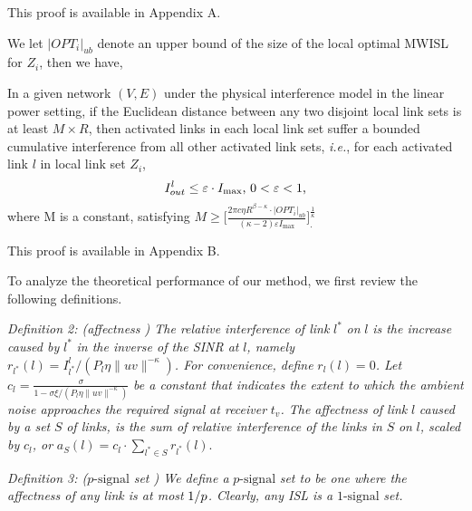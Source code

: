 \documentclass[journal]{IEEEtran}
\begin{document}
\begin{IEEEproof}
This proof is available in Appendix A.
\end{IEEEproof}
We let $|OPT_{i}|_{ub}$ denote an upper bound of the size of the local optimal MWISL for $Z_i$, then we have,

\begin{lemma}
In a given network $(V,E)$ under the physical interference model in the linear power setting, if the Euclidean distance between any two disjoint local link sets is at least $M\times R $, then activated links in each local link set suffer a bounded cumulative interference from all other activated link sets, \emph{i.e.}, for each activated link $l$ in local link set $Z_i $,
{\small{\[
I_{out}^l \le \varepsilon \cdot I_{\max } \mbox{, } 0<\varepsilon<1  \mbox{,}
\vspace*{-0.2\baselineskip}
\]}}
where M is a constant, satisfying
{\small{$ M \ge \biggl[ \frac{2 \pi c \eta R^{\beta-\kappa} \cdot |OPT_{i}|_{ub}}{(\kappa-2) \varepsilon I_{\max}} \biggr]^{\frac{1}{\kappa}}_{\mbox{.}}$}}
\vspace*{-0.5\baselineskip}
\label{lemma1}
\end{lemma}
\begin{IEEEproof}
This proof is available in Appendix B.
\end{IEEEproof}

To analyze the theoretical performance of our method, we first review the following definitions.

\textit{Definition 2: (affectness \cite{S:phy8}) The relative interference of link }$l^* $\textit{ on }$l $\textit{ is the increase caused by }$l^* $\textit{ in the inverse of the SINR at }$l $\textit{, namely }$r_{l^* } (l )=I_{l^* }^{l } /(P_{l } \eta \|uv\|^{-\kappa})$\textit{. For convenience, define }$r_{l} (l )=0$\textit{. Let }$c_l =\frac{\sigma }{1-\sigma \xi /(P_{l } \eta \|uv\|^{-\kappa}) }$\textit{ be a constant that indicates the extent to which the ambient noise approaches the required signal at receiver }$t_v $\textit{. The affectness of link }$l $\textit{ caused by a set }$S$\textit{ of links, is the sum of relative interference of the links in }$S$\textit{ on }$l
$\textit{, scaled by }$c_l $\textit{, or}
{\small{$a_S (l )=c_l \cdot \sum\limits_{l^* \in S} {r_{l^* } (l )}.$}}

\textit{Definition 3: (}$p\mbox{-signal}$\textit{ set \cite{S:phy8}) We define a }$p\mbox{-signal}$\textit{ set to be one where the affectness of any link is at most }$1 \mathord{\left/ {\vphantom {1 p}}
\right. \kern-\nulldelimiterspace} p$\textit{. Clearly, any ISL is a }$\mbox{1-signal}$\textit{ set.}
\end{document}
